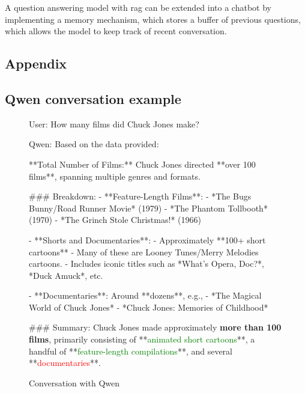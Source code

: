 \documentclass[fleqn,moreauthors,10pt]{ds_report}
\newcommand{\red}[1]{\textcolor{red}{#1}}
\newcommand{\green}[1]{\textcolor{green}{#1}}
\begin{document}
A question answering model with \ac{rag} can be extended into a chatbot by implementing a memory mechanism, which stores a buffer of previous questions, which allows the model to keep track of recent conversation.






\newpage
\begin{appendix}

\section*{Appendix}
\label{append}

\subsection*{Qwen conversation example}

\begin{figure}
\begin{tcolorbox}
User: How many films did Chuck Jones make?

Qwen: Based on the data provided:

	**Total Number of Films:**  
	Chuck Jones directed **over 100 films**, spanning multiple genres and formats.

	\#\#\# Breakdown:
	- **Feature-Length Films**: 
    		- *The Bugs Bunny/Road Runner Movie* (1979)
	    - *The Phantom Tollbooth* (1970)
	    - *The Grinch Stole Christmas!* (1966)

	- **Shorts and Documentaries**:
	    - Approximately **100+ short cartoons**
	        - Many of these are Looney Tunes/Merry Melodies cartoons.
	        - Includes iconic titles such as *What's Opera, Doc?*, *Duck Amuck*, etc.
    
	    - **Documentaries**: Around **dozens**, e.g.,
	    	    - *The Magical World of Chuck Jones*
	        - *Chuck Jones: Memories of Childhood*

	\#\#\# Summary:
	Chuck Jones made approximately \textbf{more than 100 films}, primarily consisting of **\green{animated short cartoons}**, a handful of **\green{feature-length compilations}**, and several **\red{documentaries}**.
\end{tcolorbox}
\caption{Conversation with Qwen}
\label{qwenconvo}
\end{figure}


\end{appendix}
\end{document}
